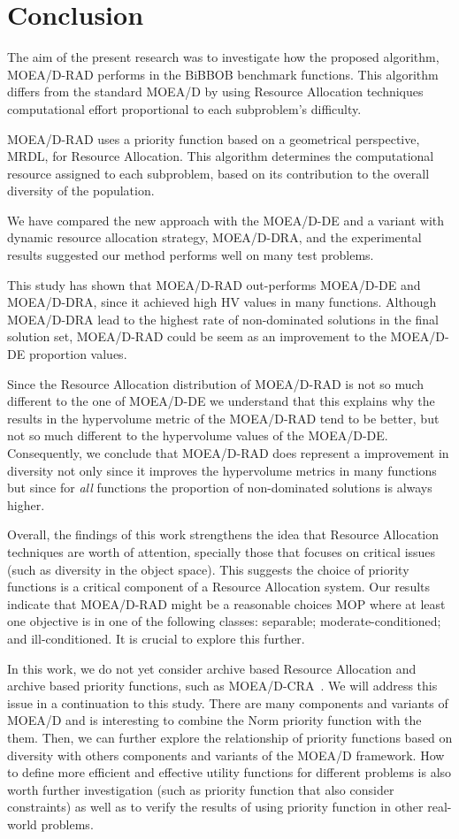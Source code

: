 \section{Conclusion}

The aim of the present research was to investigate how the proposed algorithm, MOEA/D-RAD performs in the BiBBOB benchmark functions. This algorithm differs from the standard MOEA/D by using Resource Allocation techniques computational effort proportional to each subproblem's difficulty. 

MOEA/D-RAD uses a priority function based on a geometrical perspective, MRDL, for Resource Allocation. This algorithm determines the computational resource assigned to each subproblem, based on its contribution to the overall diversity of the population.

We have compared the new approach with the MOEA/D-DE and a variant with dynamic resource allocation strategy, MOEA/D-DRA, and the experimental results suggested our method performs well on many test problems.

This study has shown that MOEA/D-RAD out-performs MOEA/D-DE and MOEA/D-DRA, since it achieved high HV values in many functions. Although MOEA/D-DRA lead to the highest rate of non-dominated solutions in the final solution set, MOEA/D-RAD could be seem as an improvement to the MOEA/D-DE proportion values.

Since the Resource Allocation distribution of MOEA/D-RAD is not so much different to the one of MOEA/D-DE we understand that this explains why the results in the hypervolume metric of the MOEA/D-RAD tend to be better, but not so much different to the hypervolume values of the MOEA/D-DE. Consequently, we conclude that MOEA/D-RAD does represent a improvement in diversity not only since it improves the hypervolume metrics in many functions but since for \textit{all} functions the proportion of non-dominated solutions is always higher.

Overall, the findings of this work strengthens the idea that Resource Allocation techniques are worth of attention, specially those that focuses on critical issues (such as diversity in the object space). This suggests the choice of priority functions is a critical component of a Resource Allocation system. Our results indicate that MOEA/D-RAD might be a  reasonable choices MOP where at least one objective is in one of the following classes: separable; moderate-conditioned; and ill-conditioned. It is crucial to  explore this further.


In this work, we do not yet consider archive based Resource Allocation and archive based priority functions, such as MOEA/D-CRA~\cite{kang2018collaborative}. We will address this issue in a continuation to this study. There are many components and variants of MOEA/D and is interesting to combine the Norm priority function with the them. Then, we can further explore the relationship of priority functions based on diversity with others components and variants of the MOEA/D framework. How to define more efficient and effective utility functions for different problems is also worth further investigation (such as priority function that also consider constraints) as well as to verify the results of using priority function in other real-world problems.
%